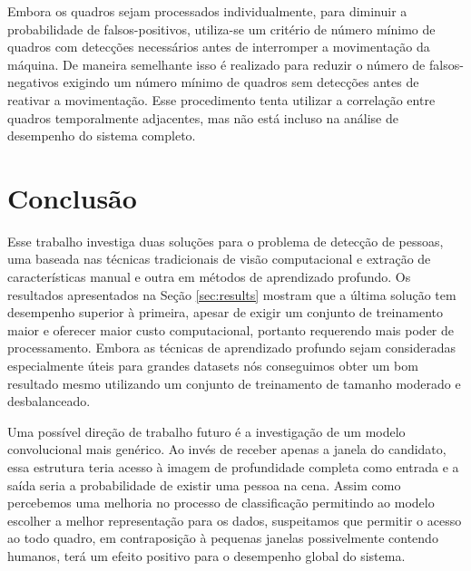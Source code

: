     Embora os quadros sejam processados individualmente, para diminuir a probabilidade de falsos-positivos, utiliza-se um critério de número mínimo de quadros com detecções necessários antes de interromper a movimentação da máquina. De maneira semelhante isso é realizado para reduzir o número de falsos-negativos exigindo um número mínimo de quadros sem detecções antes de reativar a movimentação. Esse procedimento tenta utilizar a correlação entre quadros temporalmente adjacentes, mas não está incluso na análise de desempenho do sistema completo.

\section{Conclusão}
\label{sec:conclusion}

    Esse trabalho investiga duas soluções para o problema de detecção de pessoas, uma baseada nas técnicas tradicionais de visão computacional e extração de características manual e outra em métodos de aprendizado profundo. Os resultados apresentados na Seção \ref{sec:results} mostram que a última solução tem desempenho superior à primeira, apesar de exigir um conjunto de treinamento maior e oferecer maior custo computacional, portanto requerendo mais poder de processamento. Embora as técnicas de aprendizado profundo sejam consideradas especialmente úteis para grandes datasets nós conseguimos obter um bom resultado mesmo utilizando um conjunto de treinamento de tamanho moderado e desbalanceado.

    Uma possível direção de trabalho futuro é a investigação de um modelo convolucional mais genérico. Ao invés de receber apenas a janela do candidato, essa estrutura teria acesso à imagem de profundidade completa como entrada e a saída seria a probabilidade de existir uma pessoa na cena. Assim como percebemos uma melhoria no processo de classificação permitindo ao modelo escolher a melhor representação para os dados, suspeitamos que permitir o acesso ao todo quadro, em contraposição à pequenas janelas possivelmente contendo humanos, terá um efeito positivo para o desempenho global do sistema.
